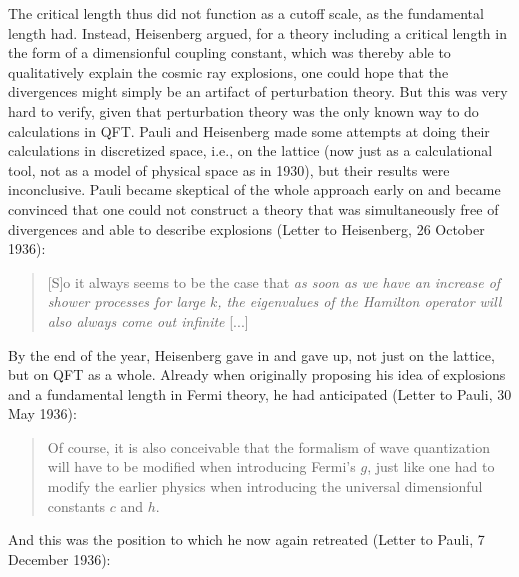 \documentclass[12pt,a4paper]{article}
\begin{document}
The critical length thus did not function as a cutoff scale, as the fundamental length had. Instead, Heisenberg argued, for a theory including a critical length in the form of a dimensionful coupling constant, which was thereby able to qualitatively explain the cosmic ray explosions, one could hope that the divergences might simply be an artifact of perturbation theory. But this was very hard to verify, given that perturbation theory was the only known way to do calculations in QFT. Pauli and Heisenberg made some attempts at doing their calculations in discretized space, i.e., on the lattice (now just as a calculational tool, not as a model of physical space as in 1930), but their results were inconclusive. Pauli became skeptical of the whole approach early on and became convinced that one could not construct a theory that was simultaneously free of divergences and able to describe explosions (Letter to Heisenberg, 26 October 1936):

\begin{quote}
[S]o it always seems to be the case that \emph{as soon as we have an increase of shower processes for large} $k$\emph{, the eigenvalues of the Hamilton operator will also always come out infinite} [...] 
\end{quote}

By the end of the year, Heisenberg gave in and gave up, not just on the lattice, but on QFT as a whole. Already when originally proposing his idea of explosions and a fundamental length in Fermi theory, he had anticipated (Letter to Pauli, 30 May 1936):

\begin{quote}
Of course, it is also conceivable that the formalism of wave quantization will have to be modified when introducing Fermi's $g$, just like one had to modify the earlier physics when introducing the universal dimensionful constants $c$ and $h$. 
\end{quote}

And this was the position to which he now again retreated (Letter to Pauli, 7 December 1936):
\end{document}
